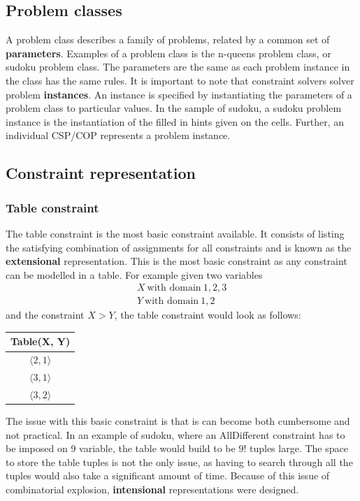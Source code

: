 \documentclass[CS4402-Notes.tex]{subfiles}
\begin{document}
\subsection{Problem classes}
A problem class describes a family of problems, related by a common set of \textbf{parameters}. Examples of a problem class is the n-queens problem class, or sudoku problem class. The parameters are the same as each problem instance in the class has the same rules. 
\n
It is important to note that constraint solvers solver problem \textbf{instances}. An instance is specified by instantiating the parameters of a problem class to particular values. In the sample of sudoku, a sudoku problem instance is the instantiation of the filled in hints given on the cells. Further, an individual CSP/COP represents a problem instance. 

\subsection{Constraint representation}
\subsubsection{Table constraint}
The table constraint is the most basic constraint available. It consists of listing the satisfying combination of assignments for all constraints and is known as the \textbf{extensional} representation. This is the most basic constraint as any constraint can be modelled in a table.
\n
For example given two variables
\begin{align*}
X\ \text{with domain}\ {1,2,3} \\
Y\ \text{with domain}\ {1,2}
\end{align*}
and the constraint $X > Y$, the table constraint would look as follows:
\begin{table}[H]
\centering
\begin{tabular}{| c |}
\hline
\textbf{Table(X, Y)} \\
\hline
$\langle 2, 1 \rangle$ \\
\hline
$\langle 3, 1 \rangle$ \\
\hline
$\langle 3, 2 \rangle$ \\
\hline
\end{tabular}
\end{table}
The issue with this basic constraint is that is can become both cumbersome and not practical. In an example of sudoku, where an AllDifferent constraint has to be imposed on 9 variable, the table would build to be $9!$ tuples large. The space to store the table tuples is not the only issue, as having to search through all the tuples would also take a significant amount of time. Because of this issue of combinatorial explosion, \textbf{intensional} representations were designed.
\end{document}
